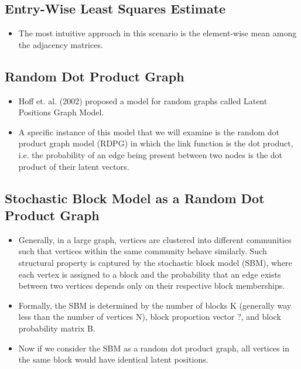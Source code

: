 \documentclass[a4paper]{article}
\begin{document}
\subsection{Entry-Wise Least Squares Estimate}
\begin{itemize}
\item The most intuitive approach in this scenario is the element-wise mean among the adjacency matrices.
\end{itemize}

\subsection{Random Dot Product Graph}
\begin{itemize}
\item Hoff et. al. (2002) proposed a model for random graphs called Latent Positions Graph Model.
\item A specific instance of this model that we will examine is the random dot product graph model (RDPG) in which the link function is the dot product, i.e. the probability of an edge being present between two nodes is the dot product of their latent vectors.
\end{itemize}

\subsection{Stochastic Block Model as a Random Dot Product Graph}
\begin{itemize}
\item Generally, in a large graph, vertices are clustered into different communities such that vertices within the same community behave similarly. Such structural property is captured by the stochastic block model (SBM), where each vertex is assigned to a block and the probability that an edge exists between two vertices depends only on their respective block memberships.
\item Formally, the SBM is determined by the number of blocks K (generally way less than the number of vertices N), block proportion vector ?, and block probability matrix B.
\item Now if we consider the SBM as a random dot product graph, all vertices in the same block would have identical latent positions.
\end{itemize}
\end{document}
